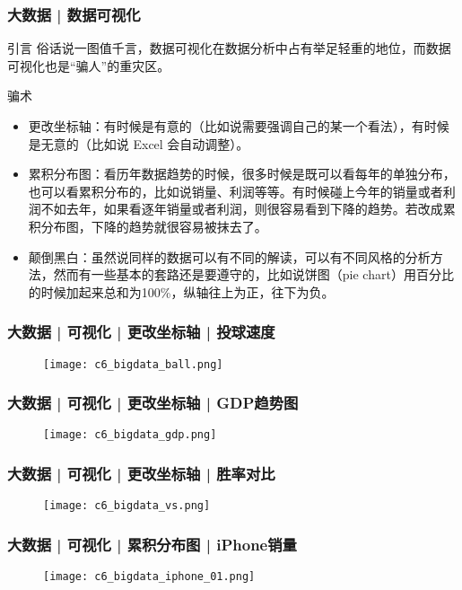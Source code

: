 \begin{frame}
  \frametitle{大数据 | 数据可视化}
  \begin{block}{引言}
    俗话说一图值千言，数据可视化在数据分析中占有举足轻重的地位，而数据可视化也是“骗人”的重灾区。
  \end{block}
  \vspace{-0.5em}
  \pause
  \begin{block}{骗术}
    \begin{itemize}
      \item 更改坐标轴：有时候是有意的（比如说需要强调自己的某一个看法），有时候是无意的（比如说 Excel 会自动调整）。
      \item 累积分布图：看历年数据趋势的时候，很多时候是既可以看每年的单独分布，也可以看累积分布的，比如说销量、利润等等。有时候碰上今年的销量或者利润不如去年，如果看逐年销量或者利润，则很容易看到下降的趋势。若改成累积分布图，下降的趋势就很容易被抹去了。
      \item 颠倒黑白：虽然说同样的数据可以有不同的解读，可以有不同风格的分析方法，然而有一些基本的套路还是要遵守的，比如说饼图（pie chart）用百分比的时候加起来总和为100\%，纵轴往上为正，往下为负。
    \end{itemize}
  \end{block}
\end{frame}

\begin{frame}
  \frametitle{大数据 | 可视化 | 更改坐标轴 | 投球速度}
  \begin{figure}
    \centering
    \texttt{[image: c6\_bigdata\_ball.png]}
  \end{figure}
\end{frame}

\begin{frame}
  \frametitle{大数据 | 可视化 | 更改坐标轴 | GDP趋势图}
  \begin{figure}
    \centering
    \texttt{[image: c6\_bigdata\_gdp.png]}
  \end{figure}
\end{frame}

\begin{frame}
  \frametitle{大数据 | 可视化 | 更改坐标轴 | 胜率对比}
  \begin{figure}
    \centering
    \texttt{[image: c6\_bigdata\_vs.png]}
  \end{figure}
\end{frame}

\begin{frame}
  \frametitle{大数据 | 可视化 | 累积分布图 | iPhone销量}
  \begin{figure}
    \centering
    \texttt{[image: c6\_bigdata\_iphone\_01.png]}
  \end{figure}
\end{frame}


